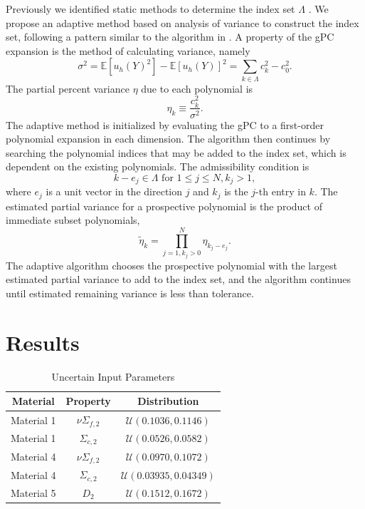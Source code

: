 \documentclass{anstrans} \usepackage{amsmath} \usepackage{amssymb}
\newcommand{\expv}[1]{\ensuremath{\mathbb{E}[ #1]}} \newcommand{\xs}[2]{\ensuremath{\Sigma_{#1}^{(#2)}}}
\begin{document}
Previously we identified static methods to determine the index set $\Lambda$ \cite{ans2014}.  We propose an
adaptive method based on analysis of variance to construct the index set, following a pattern similar to the
algorithm in \cite{Ayres}.  A property of the gPC expansion is the method of calculating variance, namely
\begin{equation}
  \sigma^2 = \expv{u_h(Y)^2} - \expv{u_h(Y)}^2 = \sum_{k\in\Lambda}c_k^2 - c_0^2.
\end{equation}
The partial percent variance $\eta$ due to each polynomial is
\begin{equation}
  \eta_k \equiv \frac{c_k^2}{\sigma^2}.
\end{equation}
The adaptive method is initialized by evaluating the gPC to a first-order polynomial expansion in each
dimension.  The algorithm then continues by searching the polynomial indices that may be added to the index
set, which is dependent on the existing polynomials.  The admissibility condition is
\begin{equation}
  k-e_j\in\Lambda \text{  for } 1\leq j\leq N, k_j>1,
\end{equation}
where $e_j$ is a unit vector in the direction $j$ and $k_j$ is the $j$-th entry in $k$.  The estimated partial variance for a prospective polynomial 
is the product of immediate subset polynomials,
\begin{equation}
  \tilde \eta_k = \prod_{j=1,k_j>0}^N \eta_{k_j-e_j}.
\end{equation}
The adaptive algorithm chooses the prospective polynomial with the largest estimated partial variance to add
to the index set, and the algorithm continues until estimated remaining variance is less than tolerance.

\section{Results}\label{results}
\begin{table}[H] 
  \centering 
  \begin{tabular}{c|c|c} 
    Material & Property & Distribution \\ \hline 
    Material 1 & $\nu\Sigma_{f,2}$ & $\mathcal{U}(0.1036,0.1146)$ \\ 
    Material 1 & $\Sigma_{c,2}$ & $\mathcal{U}(0.0526,0.0582)$  \\ 
    Material 4 & $\nu\Sigma_{f,2}$ & $\mathcal{U}(0.0970,0.1072)$ \\ 
    Material 4 & $\Sigma_{c,2}$ & $\mathcal{U}(0.03935,0.04349)$  \\ 
    Material 5 & $D_2$ & $\mathcal{U}(0.1512,0.1672)$
  \end{tabular} 
  \caption{Uncertain Input Parameters} 
  \label{params} 
\end{table}
\end{document}
